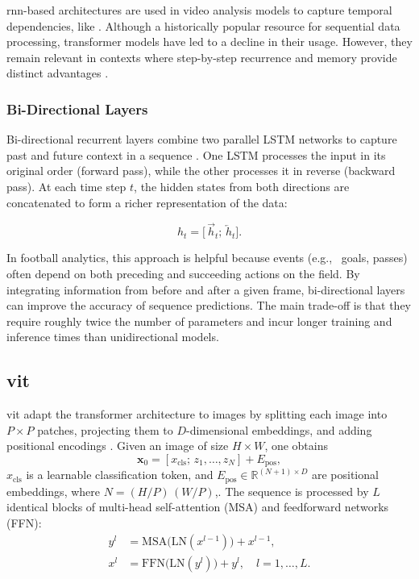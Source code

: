\acrshort{rnn}-based architectures are used in video analysis models to capture temporal dependencies, like \textcite{bhogal_human_2023}. Although a historically popular resource for sequential data processing, transformer models have led to a decline in their usage. However, they remain relevant in contexts where step-by-step recurrence and memory provide distinct advantages \cite{ibm_rnn_2025}.

\subsubsection{Bi-Directional Layers}
\label{ssec:bi_directional_layers}

Bi-directional recurrent layers combine two parallel LSTM networks to capture past and future context in a sequence \cite{radhakrishnan_bi_lstm_2023, bhogal_human_2023}. One LSTM processes the input in its original order (forward pass), while the other processes it in reverse (backward pass). At each time step \(t\), the hidden states from both directions are concatenated to form a richer representation of the data:

\[
h_t = \bigl[\,\overrightarrow{h}_t;\,\overleftarrow{h}_t\bigr].
\]

In football analytics, this approach is helpful because events (e.g., \ goals, passes) often depend on both preceding and succeeding actions on the field. By integrating information from before and after a given frame, bi-directional layers can improve the accuracy of sequence predictions. The main trade-off is that they require roughly twice the number of parameters and incur longer training and inference times than unidirectional models.




\subsection{\acrfull{vit}}
\label{ssec:vision_transformers}

\acrlong{vit} adapt the transformer architecture \cite{vaswani_attention_2017}  to images by splitting each image into $P\times P$ patches, projecting them to $D$-dimensional embeddings, and adding positional encodings \cite{dosovitskiy_image_transformer_2021}. Given an image of size $H\times W$, one obtains
\[
\mathbf{x}_0 = [x_{\text{cls}};\,z_1,\dots,z_N] + E_{\text{pos}},
\]
$x_{\text{cls}}$ is a learnable classification token, and $E_{\text{pos}}\in\mathbb{R}^{(N+1)\times D}$ are positional embeddings, where $N=(H/P)\,(W/P)$,. The sequence is processed by $L$ identical blocks of multi-head self-attention (MSA) and feedforward networks (FFN)\cite{dosovitskiy_image_transformer_2021}:
\begin{align*}
y^l &= \mathrm{MSA}\bigl(\mathrm{LN}(x^{l-1})\bigr) + x^{l-1},\\
x^l &= \mathrm{FFN}\bigl(\mathrm{LN}(y^l)\bigr) + y^l,\quad l=1,\dots,L.
\end{align*}

